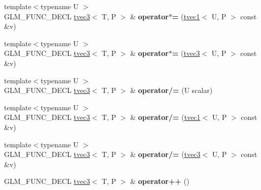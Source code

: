 \begin{DoxyCompactItemize}
\mbox{\label{structglm_1_1tvec3_a8bf034f6ec15f8a4d316338cbe30d727}} 
{\footnotesize template$<$typename U $>$ }\\G\+L\+M\+\_\+\+F\+U\+N\+C\+\_\+\+D\+E\+CL \hyperlink{structglm_1_1tvec3}{tvec3}$<$ T, P $>$ \& {\bfseries operator$\ast$=} (\hyperlink{structglm_1_1tvec1}{tvec1}$<$ U, P $>$ const \&v)
\item 
\mbox{\label{structglm_1_1tvec3_a924cfee1337bc2f0800519e5fbdf902f}} 
{\footnotesize template$<$typename U $>$ }\\G\+L\+M\+\_\+\+F\+U\+N\+C\+\_\+\+D\+E\+CL \hyperlink{structglm_1_1tvec3}{tvec3}$<$ T, P $>$ \& {\bfseries operator$\ast$=} (\hyperlink{structglm_1_1tvec3}{tvec3}$<$ U, P $>$ const \&v)
\item 
\mbox{\label{structglm_1_1tvec3_a52731a1715cbe4886455e890ad958dc3}} 
{\footnotesize template$<$typename U $>$ }\\G\+L\+M\+\_\+\+F\+U\+N\+C\+\_\+\+D\+E\+CL \hyperlink{structglm_1_1tvec3}{tvec3}$<$ T, P $>$ \& {\bfseries operator/=} (U scalar)
\item 
\mbox{\label{structglm_1_1tvec3_a05b1642c5a3b3be5a2bac556a06f3118}} 
{\footnotesize template$<$typename U $>$ }\\G\+L\+M\+\_\+\+F\+U\+N\+C\+\_\+\+D\+E\+CL \hyperlink{structglm_1_1tvec3}{tvec3}$<$ T, P $>$ \& {\bfseries operator/=} (\hyperlink{structglm_1_1tvec1}{tvec1}$<$ U, P $>$ const \&v)
\item 
\mbox{\label{structglm_1_1tvec3_a0e3c90e6a8dbab2102b88775942261d1}} 
{\footnotesize template$<$typename U $>$ }\\G\+L\+M\+\_\+\+F\+U\+N\+C\+\_\+\+D\+E\+CL \hyperlink{structglm_1_1tvec3}{tvec3}$<$ T, P $>$ \& {\bfseries operator/=} (\hyperlink{structglm_1_1tvec3}{tvec3}$<$ U, P $>$ const \&v)
\item 
\mbox{\label{structglm_1_1tvec3_ac7d121d0cd2f4f53227be86b4c08289f}} 
G\+L\+M\+\_\+\+F\+U\+N\+C\+\_\+\+D\+E\+CL \hyperlink{structglm_1_1tvec3}{tvec3}$<$ T, P $>$ \& {\bfseries operator++} ()
\item 
\mbox{\label{structglm_1_1tvec3_a61447785338db749ad3bdb5c97b8c710}} 

\end{DoxyCompactItemize}
